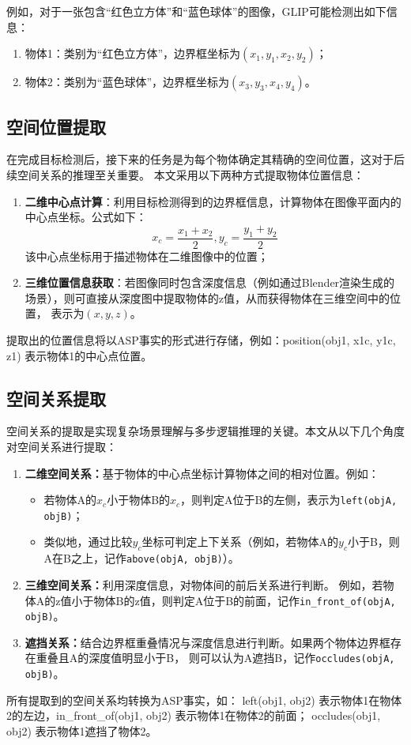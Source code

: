 例如，对于一张包含“红色立方体”和“蓝色球体”的图像，GLIP可能检测出如下信息： 
\begin{enumerate}[itemsep=0pt,parsep=0pt] 
\item 物体1：类别为“红色立方体”，边界框坐标为$(x_1, y_1, x_2, y_2)$； 
\item 物体2：类别为“蓝色球体”，边界框坐标为$(x_3, y_3, x_4, y_4)$。 
\end{enumerate}
\subsection{空间位置提取}
在完成目标检测后，接下来的任务是为每个物体确定其精确的空间位置，这对于后续空间关系的推理至关重要。
本文采用以下两种方式提取物体位置信息：
\begin{enumerate}
\item \textbf{二维中心点计算}：利用目标检测得到的边界框信息，计算物体在图像平面内的中心点坐标。公式如下：
$$x_c = \frac{x_1+x_2}{2}, y_c = \frac{y_1 + y_2}{2}$$
该中心点坐标用于描述物体在二维图像中的位置；
\item \textbf{三维位置信息获取}：若图像同时包含深度信息（例如通过Blender渲染生成的场景），则可直接从深度图中提取物体的z值，从而获得物体在三维空间中的位置，
表示为$(x, y, z)$。
\end{enumerate}

提取出的位置信息将以ASP事实的形式进行存储，例如：position(obj1, x1c, y1c, z1) 表示物体1的中心点位置。
\subsection{空间关系提取}
空间关系的提取是实现复杂场景理解与多步逻辑推理的关键。本文从以下几个角度对空间关系进行提取：
\begin{enumerate}[label=(\arabic*),itemsep=0.5em] 
\item \textbf{二维空间关系：}基于物体的中心点坐标计算物体之间的相对位置。例如： 
    \begin{itemize}[leftmargin=2em] 
        \item 若物体A的$x_c$小于物体B的$x_c$，则判定A位于B的左侧，表示为\texttt{left(objA, objB)}； 
        \item 类似地，通过比较$y_c$坐标可判定上下关系（例如，若物体A的$y_c$小于B，则A在B之上，记作\texttt{above(objA, objB)}）。 
    \end{itemize} 
\item \textbf{三维空间关系：}利用深度信息，对物体间的前后关系进行判断。
例如，若物体A的z值小于物体B的z值，则判定A位于B的前面，记作\texttt{in\_front\_of(objA, objB)}。 
\item \textbf{遮挡关系：}结合边界框重叠情况与深度信息进行判断。如果两个物体边界框存在重叠且A的深度值明显小于B，
则可以认为A遮挡B，记作\texttt{occludes(objA, objB)}。 
\end{enumerate}
所有提取到的空间关系均转换为ASP事实，如：
left(obj1, obj2) 表示物体1在物体2的左边，in\_front\_of(obj1, obj2) 表示物体1在物体2的前面；
occludes(obj1, obj2) 表示物体1遮挡了物体2。
